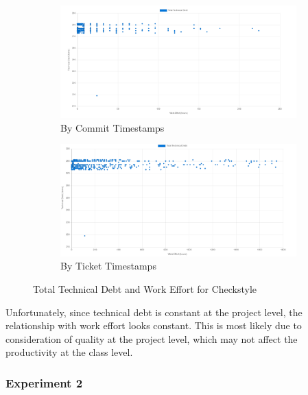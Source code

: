 \documentclass{mpaper}
\begin{document}
\begin{figure}
	\centering
	\begin{subfigure}{.45\textwidth}
		\includegraphics[width=\linewidth]{images/checkstyle_total_debt_commit.png}
		\caption{By Commit Timestamps}
		\label{fig:td-total-debt-commit}
	\end{subfigure}
	\begin{subfigure}{.45\textwidth}
		\includegraphics[width=\linewidth]{images/checkstyle_total_debt_ticket.png}
		\caption{By Ticket Timestamps}
		\label{fig:td-total-debt-ticket}
	\end{subfigure}
	\caption{Total Technical Debt and Work Effort for Checkstyle}
	\label{fig:td-total-debt}
\end{figure}

Unfortunately, since technical debt is constant at the project level, the
relationship with work effort looks constant. This is most likely due to
consideration of quality at the project level, which may not affect the
productivity at the class level. 

\subsubsection*{Experiment 2}
\label{experiment-2}
\end{document}
